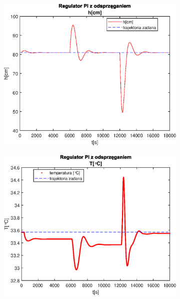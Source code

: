 \begin{figure}[h!]
   \centering
   \begin{subfigure}[b]{0.4\textwidth}
      \includegraphics[width=1\linewidth]{img/PI/decoupler/disturbance/PIDecouplerH2DisttrueLinfalse.eps}
      \caption{}
      \label{fig:fig:PIDecoupler2DisttrueLinfalse1}
   \end{subfigure}
       
   \begin{subfigure}[b]{0.4\textwidth}
      \includegraphics[width=1\linewidth]{img/PI/decoupler/disturbance/PIDecouplerT2DisttrueLinfalse.eps}
      \caption{}
      \label{fig:fig:PIDecoupler2DisttrueLinfalse2}
   \end{subfigure}
       

\end{figure}
